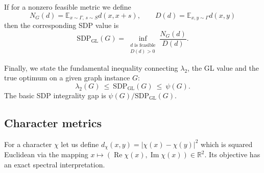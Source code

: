 \documentclass[11pt]{article}
\theoremstyle{definition}
\theoremstyle{remark}
\newcommand{\E}{\mathbb{E}}
\newcommand{\R}{\mathbb{R}}
\newcommand{\Ree}{\operatorname{Re}}
\newcommand{\gl}{\operatorname{SDP_{GL}}}
\begin{document}
If for a nonzero feasible metric we define
\begin{equation}\label{eq:metric-ND}
  N_G(d)=\E_{x\sim\Gamma,\,s\sim S}d(x,x+s),
  \qquad
  D(d)=\E_{x,y\sim\Gamma}d(x,y)
\end{equation}
then the corresponding SDP value is
\begin{equation}\label{eq:arv-def}
  \gl(G)=\inf_{\substack{d\text{ is feasible}\\D(d)>0}}
  \frac{N_G(d)}{D(d)}.
\end{equation}

Finally, we state the fundamental inequality connecting $\lambda_2$, the GL value and the true optimum on a given graph instance $G$:
\begin{equation}\label{eq:fundamental-chain}
  \lambda_2(G) ~\leq~ \gl(G) ~\leq~ \psi(G).
\end{equation}
The basic SDP integrality gap is $\psi(G)/\gl(G)$.



\subsection{Character metrics}
For a character $\chi$ let us define $d_\chi(x,y)=|\chi(x)-\chi(y)|^2$ which is squared Euclidean via the mapping $x\mapsto(\Ree\chi(x),\operatorname{Im}\chi(x))\in\R^2$. Its objective has an exact spectral interpretation.
\end{document}
